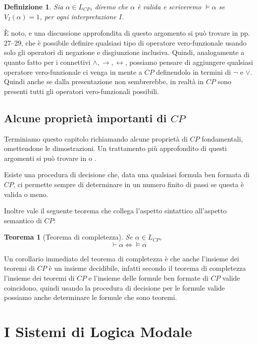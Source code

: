 \documentclass[a4paper, titlepage, 12pt]{report}
\newtheorem{theorem}{Teorema}[chapter]
\newtheorem{definition}{Definizione}[chapter]
\begin{document}
\begin{definition}
Sia $\alpha \in L_{CP}$, diremo che $\alpha$ è valida e scriveremo $\vDash \alpha$ se
$V_I(\alpha) = 1$, per ogni interpretazione $I$.
\end{definition}

È noto, e una discussione approfondita di questo argomento si può trovare in \cite{Mendelson}
pp. 27--29,
che è possibile definire qualsiasi tipo di operatore vero-funzionale usando
solo gli operatori di negazione e disgiunzione inclusiva.
Quindi, analogamente a quanto fatto per i connettivi $\land, \rightarrow, \leftrightarrow$,
possiamo pensare di aggiungere qualsiasi operatore vero-funzionale ci venga in mente
a $CP$ definendolo in termini di $\neg$ e $\lor$.
Quindi anche se dalla presentazione non sembrerebbe, in realtà in $CP$ sono presenti
tutti gli operatori vero-funzionali possibili.

\section{Alcune proprietà importanti di $CP$}

Terminiamo questo capitolo richiamando alcune proprietà di $CP$ fondamentali, omettendone
le dimostrazioni. Un trattamento più approfondito di questi argomenti si può trovare in
\cite{Tortora} o \cite{Mendelson}.

Esiste una procedura di decisione che, data una qualsiasi formula ben formata di $CP$,
ci permette sempre di determinare in un numero finito di passi se questa è valida o meno.

Inoltre vale il seguente teorema che collega l'aspetto sintattico all'aspetto semantico
di $CP$:

\begin{theorem}[Teorema di completezza]
Se $\alpha \in L_{CP}$,
$$\vdash \alpha \Leftrightarrow \vDash \alpha$$
\end{theorem}

Un corollario immediato del teorema di completezza è che anche l'insieme dei teoremi
di $CP$ è un insieme decidibile, infatti secondo il teorema di completezza
l'insieme dei teoremi di $CP$ e l'insieme delle formule ben formate di $CP$ valide
coincidono, quindi usando la procedura di decisione per le formule valide
possiamo anche determinare le formule che sono teoremi.

\chapter{I Sistemi di Logica Modale}
\end{document}
